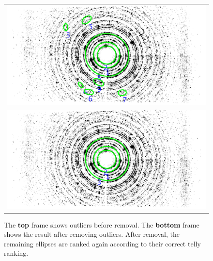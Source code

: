 \documentclass[preprint]{iucr}              %
\begin{document}
\begin{figure}
\begin{tabular}{c}
\includegraphics[width=.80\linewidth]{Outliers/o_LaB6_0021__Ranked_FullSize_9.png}
\\
\includegraphics[width=.80\linewidth]{Outliers/o_Lab6_0021__Ranked_FullSize_3.png}
\end{tabular}

\label{fig:result_outliers}
\caption {The \textbf{top} frame shows outliers before removal. 
The \textbf{bottom} frame shows the result after removing outliers. 
After removal, the remaining ellipses are ranked again according to their
correct telly ranking.} 
\end{figure}
\end{document}
